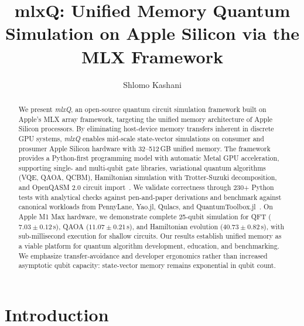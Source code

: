 \documentclass[runningheads]{llncs}
\newcommand{\mlxquantum}{\textit{mlxQ}\xspace}
\begin{document}
\title{mlxQ: Unified Memory Quantum Simulation on Apple Silicon via the MLX Framework}
\author{Shlomo Kashani}
\maketitle

\begin{abstract}
We present \mlxquantum, an open-source quantum circuit simulation framework built on Apple's MLX array framework, targeting the unified memory architecture of Apple Silicon processors. By eliminating host-device memory transfers inherent in discrete GPU systems, \mlxquantum enables mid-scale state-vector simulations on consumer and prosumer Apple Silicon hardware with 32--512\,GB unified memory. The framework provides a Python-first programming model with automatic Metal GPU acceleration, supporting single- and multi-qubit gate libraries, variational quantum algorithms (VQE, QAOA, QCBM), Hamiltonian simulation with Trotter-Suzuki decomposition, and OpenQASM 2.0 circuit import~\cite{OpenQASM2017}. We validate correctness through 230+ Python tests with analytical checks against pen-and-paper derivations and benchmark against canonical workloads from PennyLane, Yao.jl, Qulacs, and QuantumToolbox.jl~\cite{PennyLane2022,YaoJL2024,Qulacs,QuantumToolboxJulia2024}. On Apple M1 Max hardware, we demonstrate complete 25-qubit simulation for QFT ($7.03\pm0.12$\,s), QAOA ($11.07\pm0.21$\,s), and Hamiltonian evolution ($40.73\pm0.82$\,s), with sub-millisecond execution for shallow circuits. Our results establish unified memory as a viable platform for quantum algorithm development, education, and benchmarking. We emphasize transfer-avoidance and developer ergonomics rather than increased asymptotic qubit capacity: state-vector memory remains exponential in qubit count.
\end{abstract}

\section{Introduction}
\end{document}
